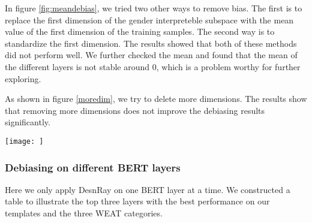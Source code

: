 In figure \ref{fig:meandebias}, we tried two other ways to remove bias. The first is to replace the first dimension of the gender interpreteble subspace with the mean value of the first dimension of the training samples. The second way is to standardize the first dimension. The results showed that both of these methods did not perform well. We further checked the mean and found that the mean of the different layers is not stable around 0, which is a problem worthy for further exploring.
\begin{figure*}
    \centering
    \caption{Here should be a graph.}
    \label{fig:meandebias}
\end{figure*}

As shown in figure \ref{moredim}, we try to delete more dimensions. The results show that removing more dimensions does not improve the debiasing results significantly. 
\begin{figure*}
    \centering
    \texttt{[image: ]}
    \caption{Here should be a graph.}
    \label{fig:moredim}
\end{figure*}

\subsubsection{Debiasing on different BERT layers}
Here we only apply DesnRay on one BERT layer at a time. We constructed a table to illustrate the top three layers with the best performance on our templates and the three WEAT categories.
\begin{table*}[ht]
\centering
\begin{tabular}{llllllllll}
\hline
\end{tabular}
\caption{\label{t:bestlayers}
Here needs a table.}
\end{table*}

